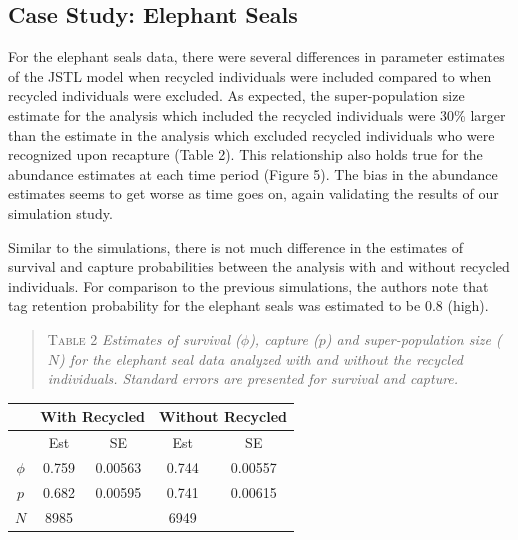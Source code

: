 \documentclass[]{article}
\begin{document}
\subsection{Case Study: Elephant
Seals}\label{case-study-elephant-seals-1}

For the elephant seals data, there were several differences in parameter
estimates of the JSTL model when recycled individuals were included
compared to when recycled individuals were excluded. As expected, the
super-population size estimate for the analysis which included the
recycled individuals were 30\% larger than the estimate in the analysis
which excluded recycled individuals who were recognized upon recapture
(Table 2). This relationship also holds true for the abundance estimates
at each time period (Figure 5). The bias in the abundance estimates
seems to get worse as time goes on, again validating the results of our
simulation study.

Similar to the simulations, there is not much difference in the
estimates of survival and capture probabilities between the analysis
with and without recycled individuals. For comparison to the previous
simulations, the authors note that tag retention probability for the
elephant seals was estimated to be 0.8 (high).

\begin{quote}
\textsc{Table 2}
\textsl{Estimates of survival ($\phi$), capture ($p$) and super-population size ($N$) for the elephant seal data analyzed with and without the recycled individuals. Standard errors are presented for survival and capture.}
\end{quote}

\begin{center}
\begin{tabular}{c c c c c}
& \multicolumn{2}{l}{With Recycled} & \multicolumn{2}{l}{Without Recycled} \\ \hline
& Est & SE & Est & SE \\ \hline
$\phi$ & 0.759 & 0.00563 & 0.744 & 0.00557\\
$p$ & 0.682 & 0.00595 & 0.741 & 0.00615 \\
$N$ & 8985 & & 6949& \\
\end{tabular}
\end{center}
\end{document}
